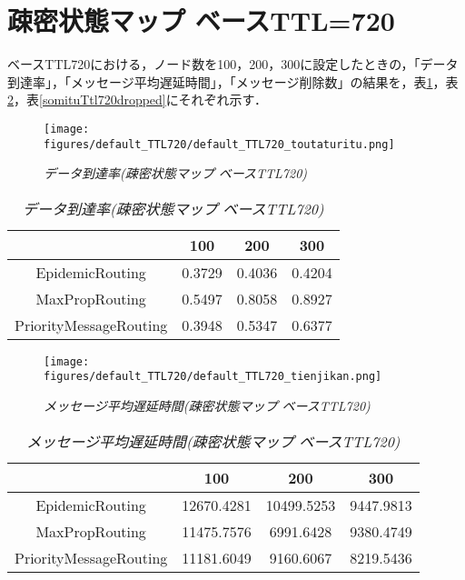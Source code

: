\documentclass[11pt]{icsthesis}
\begin{document}
\section{疎密状態マップ ベースTTL=720}
ベースTTL720における，ノード数を100，200，300に設定したときの，「データ到達率」，「メッセージ平均遅延時間」，「メッセージ削除数」の結果を，表\ref{somituTtl720deliveryprob}，表\ref{somituTtl720latencyavg}，表\ref{somituTtl720dropped}にそれぞれ示す．

\begin{figure}[h]
\centering
\texttt{[image: figures/default\_TTL720/default\_TTL720\_toutaturitu.png]}
\caption[]{\it{データ到達率(疎密状態マップ ベースTTL720)}}
\label{somituttl720deliveryprobgraph}
\end{figure}

\begin{table}[H]
 \begin{center}
      \caption[]{\it{データ到達率(疎密状態マップ ベースTTL720)}}
      \label{somituTtl720deliveryprob}
      \begin{tabular}{|c|c|c|c|}
\hline
&100&200&300\\
\hline
EpidemicRouting&0.3729&0.4036&0.4204\\
\hline
MaxPropRouting&0.5497&0.8058&0.8927\\
\hline
PriorityMessageRouting&0.3948&0.5347&0.6377\\
\hline
      \end{tabular}
    \end{center}
\end{table}

\newpage

\begin{figure}[h]
\centering
\texttt{[image: figures/default\_TTL720/default\_TTL720\_tienjikan.png]}
\caption[]{\it{メッセージ平均遅延時間(疎密状態マップ ベースTTL720)}}
\label{somituttl720latencyavggraph}
\end{figure}

\begin{table}[H]
 \begin{center}
      \caption[]{\it{メッセージ平均遅延時間(疎密状態マップ ベースTTL720)}}
      \label{somituTtl720latencyavg}
      \begin{tabular}{|c|c|c|c|}
\hline
&100&200&300\\
\hline
EpidemicRouting&12670.4281&10499.5253&9447.9813\\
\hline
MaxPropRouting&11475.7576&6991.6428&9380.4749\\
\hline
PriorityMessageRouting&11181.6049&9160.6067&8219.5436\\
\hline
      \end{tabular}
    \end{center}
\end{table}
\end{document}
